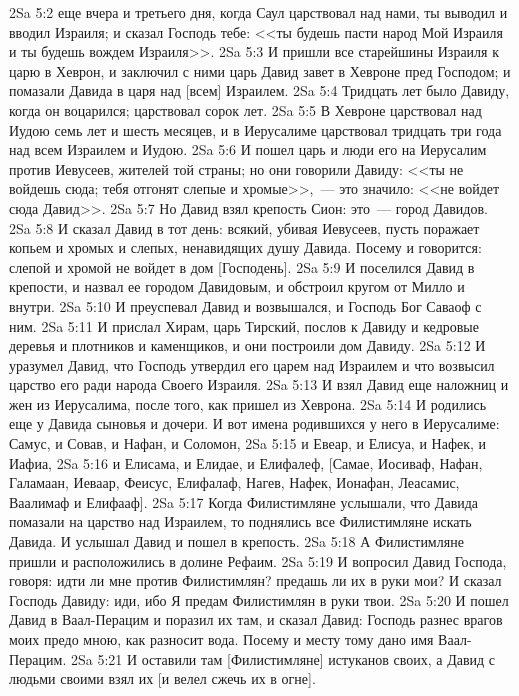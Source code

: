 \vs 2Sa 5:2 еще вчера и третьего дня, когда Саул царствовал над нами, ты выводил и вводил Израиля; и сказал Господь тебе: <<ты будешь пасти народ Мой Израиля и ты будешь вождем Израиля>>.
\vs 2Sa 5:3 И пришли все старейшины Израиля к царю в Хеврон, и заключил с ними царь Давид завет в Хевроне пред Господом; и помазали Давида в царя над [всем] Израилем.
\rsbpar\vs 2Sa 5:4 Тридцать лет было Давиду, когда он воцарился; царствовал сорок лет.
\vs 2Sa 5:5 В Хевроне царствовал над Иудою семь лет и шесть месяцев, и в Иерусалиме царствовал тридцать три года над всем Израилем и Иудою.
\vs 2Sa 5:6 И пошел царь и люди его на Иерусалим против Иевусеев, жителей той страны; но они говорили Давиду: <<ты не войдешь сюда; тебя отгонят слепые и хромые>>,~--- это значило: <<не войдет сюда Давид>>.
\vs 2Sa 5:7 Но Давид взял крепость Сион: это~--- город Давидов.
\vs 2Sa 5:8 И сказал Давид в тот день: всякий, убивая Иевусеев, пусть поражает копьем и хромых и слепых, ненавидящих душу Давида. Посему и говорится: слепой и хромой не войдет в дом [Господень].
\vs 2Sa 5:9 И поселился Давид в крепости, и назвал ее городом Давидовым, и обстроил кругом от Милло и внутри.
\vs 2Sa 5:10 И преуспевал Давид и возвышался, и Господь Бог Саваоф  с ним.
\rsbpar\vs 2Sa 5:11 И прислал Хирам, царь Тирский, послов к Давиду и кедровые деревья и плотников и каменщиков, и они построили дом Давиду.
\vs 2Sa 5:12 И уразумел Давид, что Господь утвердил его царем над Израилем и что возвысил царство его ради народа Своего Израиля.
\vs 2Sa 5:13 И взял Давид еще наложниц и жен из Иерусалима, после того, как пришел из Хеврона.
\vs 2Sa 5:14 И родились еще у Давида сыновья и дочери. И вот имена родившихся у него в Иерусалиме: Самус, и Совав, и Нафан, и Соломон,
\vs 2Sa 5:15 и Евеар, и Елисуа, и Нафек, и Иафиа,
\vs 2Sa 5:16 и Елисама, и Елидае, и Елифалеф, [Самае, Иосиваф, Нафан, Галамаан, Иеваар, Феисус, Елифалаф, Нагев, Нафек, Ионафан, Леасамис, Ваалимаф и Елифааф].
\rsbpar\vs 2Sa 5:17 Когда Филистимляне услышали, что Давида помазали на царство над Израилем, то поднялись все Филистимляне искать Давида. И услышал Давид и пошел в крепость.
\vs 2Sa 5:18 А Филистимляне пришли и расположились в долине Рефаим.
\vs 2Sa 5:19 И вопросил Давид Господа, говоря: идти ли мне против Филистимлян? предашь ли их в руки мои? И сказал Господь Давиду: иди, ибо Я предам Филистимлян в руки твои.
\vs 2Sa 5:20 И пошел Давид в Ваал-Перацим и поразил их там, и сказал Давид: Господь разнес врагов моих предо мною, как разносит вода. Посему и месту тому дано имя Ваал-Перацим.
\vs 2Sa 5:21 И оставили там [Филистимляне] истуканов своих, а Давид с людьми своими взял их [и велел сжечь их в огне].

